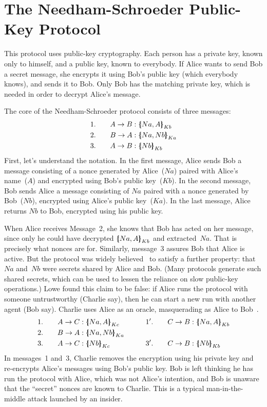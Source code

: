 \section{The Needham-Schroeder Public-Key Protocol}\label{sec:ns-protocol}

This protocol uses public-key cryptography. Each person has a private key, known only to
himself, and a public key, known to everybody. If Alice wants to send Bob a secret message, she
encrypts it using Bob's public key (which everybody knows), and sends it to Bob. Only Bob has the
matching private key, which is needed in order to decrypt Alice's message.

The core of the Needham-Schroeder protocol consists of three messages:
\begin{alignat*}{2}
  &1.&\quad  A\to B  &: \mathopen{\{\kern-.30em|} Na,A\mathclose{|\kern-.32em\}}\sb{Kb} \\
  &2.&\quad  B\to A  &: \mathopen{\{\kern-.30em|} Na,Nb\mathclose{|\kern-.32em\}}\sb{Ka} \\
  &3.&\quad  A\to B  &: \mathopen{\{\kern-.30em|} Nb\mathclose{|\kern-.32em\}}\sb{Kb}
\end{alignat*}
First, let's understand the notation. In the first message, Alice
sends Bob a message consisting of a nonce generated by Alice~($Na$)
paired  with Alice's name~($A$) and encrypted using Bob's public
key~($Kb$). In the second message, Bob sends Alice a message
consisting of $Na$ paired with a nonce generated by Bob~($Nb$), 
encrypted using Alice's public key~($Ka$). In the last message, Alice
returns $Nb$ to Bob, encrypted using his public key.

When Alice receives Message~2, she knows that Bob has acted on her
message, since only he could have decrypted
$\mathopen{\{\kern-.30em|} Na,A\mathclose{|\kern-.32em\}}\sb{Kb}$ and extracted~$Na$.  That is precisely what
nonces are for.  Similarly, message~3 assures Bob that Alice is
active.  But the protocol was widely believed~\cite{ban89} to satisfy a
further property: that
$Na$ and~$Nb$ were secrets shared by Alice and Bob.  (Many
protocols generate such shared secrets, which can be used
to lessen the reliance on slow public-key operations.)  Lowe found this
claim to be false: if Alice runs the protocol with someone untrustworthy
(Charlie say), then he can start a new run with another agent (Bob say). 
Charlie uses Alice as an oracle, masquerading as
Alice to Bob~\cite{lowe-fdr}.
\begin{alignat*}{4}
  &1.&\quad  A\to C  &: \comp{Na,A}\sb{Kc}   &&
      \qquad 1'.&\quad  C\to B  &: \comp{Na,A}\sb{Kb} \\
  &2.&\quad  B\to A  &: \comp{Na,Nb}\sb{Ka} \\
  &3.&\quad  A\to C  &: \comp{Nb}\sb{Kc}  &&
      \qquad 3'.&\quad  C\to B  &: \comp{Nb}\sb{Kb}
\end{alignat*}
In messages~1 and~3, Charlie removes the encryption using his private
key and re-encrypts Alice's messages using Bob's public key. Bob is
left thinking he has run the protocol with Alice, which was not
Alice's intention, and Bob is unaware that the ``secret'' nonces are
known to Charlie.  This is a typical man-in-the-middle attack launched
by an insider.

